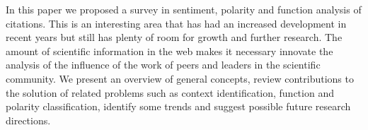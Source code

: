 In this paper we proposed a survey in sentiment, polarity and function analysis of citations. This is an interesting area that has had an increased development in recent years but still has plenty of room for growth and further research. The amount of scientific information in the web makes it necessary innovate the analysis of the influence of the work of peers and leaders in the scientific community. We present an overview of general concepts, review contributions to the solution of related problems such as context identification, function and polarity classification, identify some trends and suggest possible future research directions.
